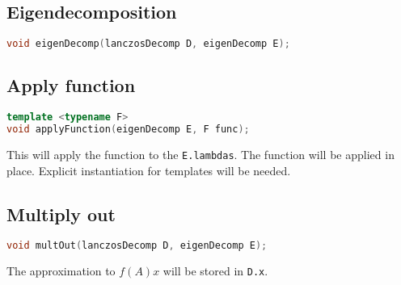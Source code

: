 \documentclass[a4paper, fleqn]{article}
\begin{document}
\subsection{Eigendecomposition}%
\label{sub:eig}

\begin{lstlisting}[language = C++]
void eigenDecomp(lanczosDecomp D, eigenDecomp E);
\end{lstlisting}

\subsection{Apply function}%
\label{sub:apply_function}
\begin{lstlisting}[language = C++]
template <typename F>
void applyFunction(eigenDecomp E, F func);
\end{lstlisting}
This will apply the function to the \texttt{E.lambdas}. The function will be applied in place. Explicit instantiation for templates will be needed.
\subsection{Multiply out}%
\label{sub:multiply_out}
\begin{lstlisting}[language = C++]
void multOut(lanczosDecomp D, eigenDecomp E);
\end{lstlisting}
The approximation to $f(A)x$ will be stored in  \texttt{D.x}. 
\end{document}
